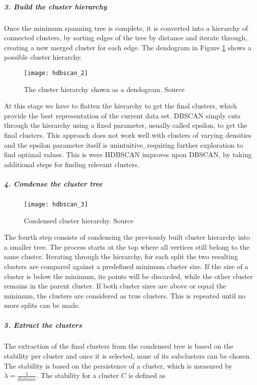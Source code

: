 \subparagraph{3. Build the cluster hierarchy}

Once the minimum spanning tree is complete, it is converted into a hierarchy of connected clusters, by sorting edges of the tree by distance and iterate through, creating a new merged cluster for each edge. The dendogram in Figure \ref{fig:hdbscan_2} shows a possible cluster hierarchy. %

\begin{figure}[h]
    \centering
    \texttt{[image: hdbscan\_2]}
    \caption{The cluster hierarchy shown as a dendogram. Source\cite{how_hdbscan_works}}
    \label{fig:hdbscan_2}
\end{figure}

At this stage we have to flatten the hierarchy to get the final clusters, which provide the best representation of the current data set. DBSCAN simply cuts through the hierarchy using a fixed parameter, usually called epsilon, to get the final clusters. This approach does not work well with clusters of varying densities and the epsilon parameter itself is unintuitive, requiring further exploration to find optimal values. This is were HDBSCAN improves upon DBSCAN, by taking additional steps for finding relevant clusters.

\subparagraph{4. Condense the cluster tree}

\begin{figure}[h]
    \centering
    \texttt{[image: hdbscan\_3]}
    \caption{Condensed cluster hierarchy. Source\cite{how_hdbscan_works}}
    \label{fig:hdbscan_3}
\end{figure}

The fourth step consists of condensing the previously built cluster hierarchy into a smaller tree. The process starts at the top where all vertices still belong to the same cluster. Iterating through the hierarchy, for each split the two resulting clusters are compared against a predefined minimum cluster size. If the size of a cluster is below the minimum, its points will be discarded, while the other cluster remains in the parent cluster. If both cluster sizes are above or equal the minimum, the clusters are considered as true clusters. This is repeated until no more splits can be made. 


\subparagraph{5. Extract the clusters}

The extraction of the final clusters from the condensed tree is based on the stability per cluster and once it is selected, none of its subclusters can be chosen. The stability is based on the persistence of a cluster, which is measured by $\lambda = \frac{1}{distance}$. The stability for a cluster $C$ is defined as

